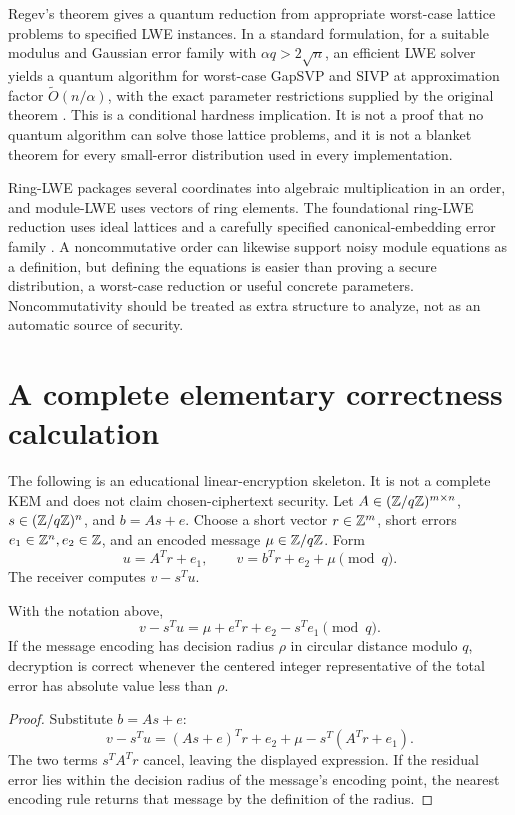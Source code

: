 Regev's theorem gives a quantum reduction from appropriate worst-case lattice problems to specified LWE instances. In a standard formulation, for a suitable modulus and Gaussian error family with $\alpha q>2\sqrt n$, an efficient LWE solver yields a quantum algorithm for worst-case GapSVP and SIVP at approximation factor $\widetilde O(n/\alpha)$, with the exact parameter restrictions supplied by the original theorem \cite{RegevLWE}. This is a conditional hardness implication. It is not a proof that no quantum algorithm can solve those lattice problems, and it is not a blanket theorem for every small-error distribution used in every implementation.

Ring-LWE packages several coordinates into algebraic multiplication in an order, and module-LWE uses vectors of ring elements. The foundational ring-LWE reduction uses ideal lattices and a carefully specified canonical-embedding error family \cite{LPRRingLWE}. A noncommutative order can likewise support noisy module equations as a definition, but defining the equations is easier than proving a secure distribution, a worst-case reduction or useful concrete parameters. Noncommutativity should be treated as extra structure to analyze, not as an automatic source of security.

\section{A complete elementary correctness calculation}
The following is an educational linear-encryption skeleton. It is not a complete KEM and does not claim chosen-ciphertext security. Let
$A\in(\mathbb{Z}/q\mathbb{Z})^{m\times n}$, $s\in(\mathbb{Z}/q\mathbb{Z})^n$, and
$b=As+e$. Choose a short vector $r\in\mathbb{Z}^m$, short errors
$e_1\in\mathbb{Z}^n,e_2\in\mathbb{Z}$, and an encoded message $\mu\in\mathbb{Z}/q\mathbb{Z}$. Form
\[
 u=A^Tr+e_1,
 \qquad v=b^Tr+e_2+\mu\pmod q.
\]
The receiver computes $v-s^Tu$.

\begin{proposition}
With the notation above,
\[
 v-s^Tu=\mu+e^Tr+e_2-s^Te_1\pmod q.
\]
If the message encoding has decision radius $\rho$ in circular distance modulo $q$, decryption is correct whenever the centered integer representative of the total error has absolute value less than $\rho$.
\end{proposition}
\begin{proof}
Substitute $b=As+e$:
\[
 v-s^Tu=(As+e)^Tr+e_2+\mu-s^T(A^Tr+e_1).
\]
The two terms $s^TA^Tr$ cancel, leaving the displayed expression. If the residual error lies within the decision radius of the message's encoding point, the nearest encoding rule returns that message by the definition of the radius.
\end{proof}

